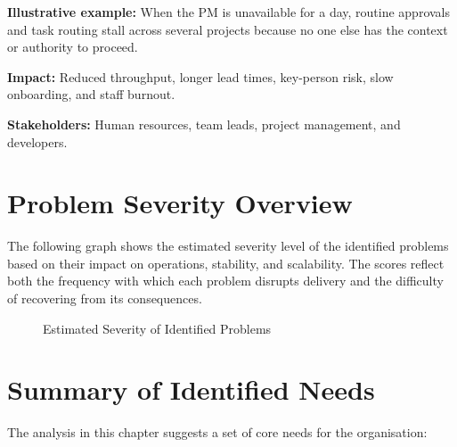 \documentclass[12pt,a4paper]{report}
\begin{document}
\textbf{Illustrative example:} When the PM is unavailable for a day, routine approvals and task routing stall across several projects because no one else has the context or authority to proceed.

\textbf{Impact:} Reduced throughput, longer lead times, key-person risk, slow onboarding, and staff burnout.

\textbf{Stakeholders:} Human resources, team leads, project management, and developers.

\section{Problem Severity Overview}
The following graph shows the estimated severity level of the identified problems based on their impact on operations, stability, and scalability. The scores reflect both the frequency with which each problem disrupts delivery and the difficulty of recovering from its consequences.

\begin{figure}[H]
\centering
{}
\caption{Estimated Severity of Identified Problems}
\end{figure}

\section{Summary of Identified Needs}
The analysis in this chapter suggests a set of core needs for the organisation:
\end{document}
